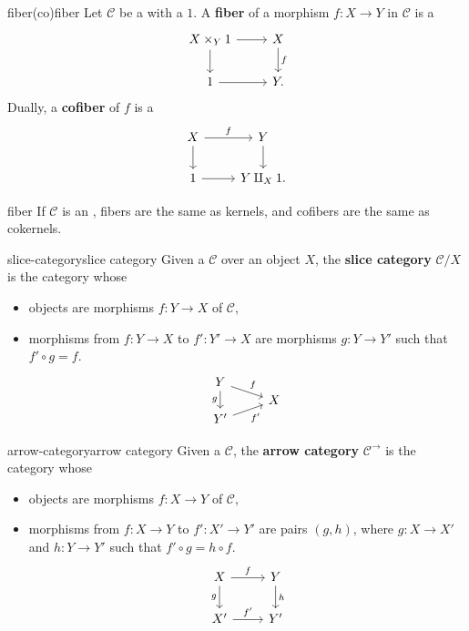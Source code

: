 \begin{topic}{fiber}{(co)fiber}
    Let $\mathcal{C}$ be a  with a  $1$. A \textbf{fiber} of a morphism $f : X \to Y$ in $\mathcal{C}$ is a 
    \[ \begin{tikzcd}
        X \times_Y 1 \arrow{r} \arrow{d} & X \arrow{d}{f} \\ 1 \arrow{r} & Y .
    \end{tikzcd} \]
    Dually, a \textbf{cofiber} of $f$ is a 
    \[ \begin{tikzcd}
        X \arrow{r}{f} \arrow{d} & Y \arrow{d} \\ 1 \arrow{r} & Y \amalg_X 1 .
    \end{tikzcd} \]
\end{topic}

\begin{example}{fiber}
    If $\mathcal{C}$ is an , fibers are the same as kernels, and cofibers are the same as cokernels.
\end{example}

\begin{topic}{slice-category}{slice category}
    Given a  $\mathcal{C}$ over an object $X$, the \textbf{slice category} $\mathcal{C}/X$ is the category whose
    \begin{itemize}
        \item objects are morphisms $f : Y \to X$ of $\mathcal{C}$,
        \item morphisms from $f : Y \to X$ to $f' : Y' \to X$ are morphisms $g : Y \to Y'$ such that $f' \circ g = f$.
        \[ \begin{tikzcd}[row sep=0em] Y \arrow{rd}{f} \arrow[swap]{dd}{g} & \\ & X \\ Y' \arrow[swap]{ur}{f'} & \end{tikzcd} \]
    \end{itemize}
\end{topic}

\begin{topic}{arrow-category}{arrow category}
    Given a  $\mathcal{C}$, the \textbf{arrow category} $\mathcal{C}^\rightarrow$ is the category whose
    \begin{itemize}
        \item objects are morphisms $f : X \to Y$ of $\mathcal{C}$,
        \item morphisms from $f : X \to Y$ to $f' : X' \to Y'$ are pairs $(g, h)$, where $g : X \to X'$ and $h : Y \to Y'$ such that $f' \circ g = h \circ f$.
        \[ \begin{tikzcd} X \arrow{r}{f} \arrow[swap]{d}{g} & Y \arrow{d}{h} \\ X' \arrow{r}{f'} & Y' \end{tikzcd} \]
    \end{itemize}
\end{topic}

